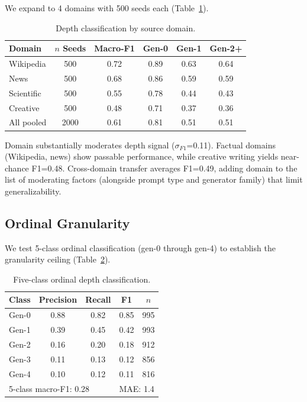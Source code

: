\documentclass[11pt]{article}
\begin{document}
We expand to 4 domains with 500 seeds each (Table~\ref{tab:domain}).

\begin{table}[h]
\centering
\caption{Depth classification by source domain.}
\label{tab:domain}
\begin{tabular}{lccccc}
\toprule
Domain & $n$ Seeds & Macro-F1 & Gen-0 & Gen-1 & Gen-2+ \\
\midrule
Wikipedia & 500 & 0.72 & 0.89 & 0.63 & 0.64 \\
News & 500 & 0.68 & 0.86 & 0.59 & 0.59 \\
Scientific & 500 & 0.55 & 0.78 & 0.44 & 0.43 \\
Creative & 500 & 0.48 & 0.71 & 0.37 & 0.36 \\
\midrule
All pooled & 2000 & 0.61 & 0.81 & 0.51 & 0.51 \\
\bottomrule
\end{tabular}
\end{table}

Domain substantially moderates depth signal ($\sigma_{F1}$=0.11).
Factual domains (Wikipedia, news) show passable performance, while creative writing yields near-chance F1=0.48.
Cross-domain transfer averages F1=0.49, adding domain to the list of moderating factors (alongside prompt type and generator family) that limit generalizability.

\subsection{Ordinal Granularity}
\label{sec:ordinal}

We test 5-class ordinal classification (gen-0 through gen-4) to establish the granularity ceiling (Table~\ref{tab:ordinal}).

\begin{table}[h]
\centering
\caption{Five-class ordinal depth classification.}
\label{tab:ordinal}
\begin{tabular}{lcccc}
\toprule
Class & Precision & Recall & F1 & $n$ \\
\midrule
Gen-0 & 0.88 & 0.82 & 0.85 & 995 \\
Gen-1 & 0.39 & 0.45 & 0.42 & 993 \\
Gen-2 & 0.16 & 0.20 & 0.18 & 912 \\
Gen-3 & 0.11 & 0.13 & 0.12 & 856 \\
Gen-4 & 0.10 & 0.12 & 0.11 & 816 \\
\midrule
\multicolumn{3}{l}{5-class macro-F1: 0.28} & \multicolumn{2}{l}{MAE: 1.4} \\
\bottomrule
\end{tabular}
\end{table}
\end{document}
